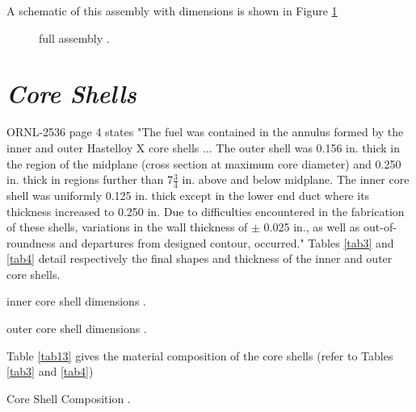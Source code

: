 \documentclass[ms,a4paper]{memoir}
\newcommand*{\msrarchive}{../../msr-archive}%
\begin{document}
A schematic of this assembly with dimensions is shown in Figure \ref{fig5}

\begin{figure}[H]
  \centering
  \caption{full assembly \parencite[Figure 23]{ornl-2536}.}
  \label{fig5}
\end{figure}

\section{\emph{Core Shells}}

ORNL-2536 page 4 states "The fuel was contained in the annulus formed by the inner and outer Hastelloy X core shells ... The outer shell was 0.156 in. thick in the region of the midplane (cross section at maximum core diameter) and 0.250 in. thick in regions further than 7$\frac{3}{4}$ in. above and below midplane. The inner core shell was uniformly 0.125 in. thick except in the lower end duct where its thickness increased to 0.250 in. Due to difficulties encountered in the fabrication of these shells, variations in the wall thickness of $\pm$ 0.025 in., as well as out-of-roundness and departures from designed contour, occurred." Tables \ref{tab3} and \ref{tab4} detail  respectively the final shapes and thickness of the inner and outer core shells.

\begin{table}[H]
  \centering
  \caption{inner core shell dimensions \parencite[Table 19]{ornl-2536}.}
  \label{tab3}
\end{table}

\begin{table}[H]
  \centering
  \caption{outer core shell dimensions \parencite[Table 20]{ornl-2536}.}
  \label{tab4}
\end{table}

Table \ref{tab13} gives the material composition of the core shells (refer to Tables \ref{tab3} and \ref{tab4})

\begin{table}[H]
  \centering
  \caption{Core Shell Composition \parencite[Table 25]{ornl-2536}.}
  \label{tab13}
\end{table}
\end{document}
